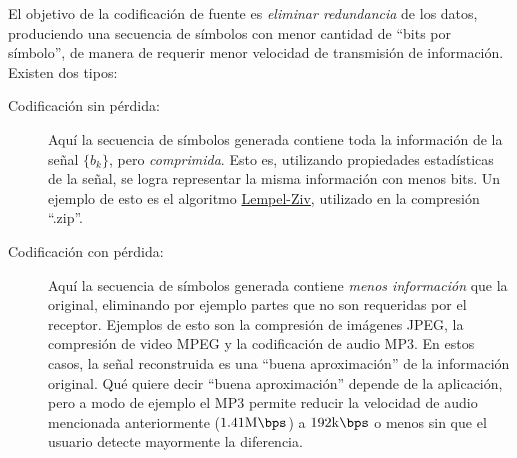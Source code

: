 El objetivo de la codificación de fuente es \emph{eliminar redundancia} de los datos, produciendo una secuencia de símbolos con menor cantidad de ``bits por símbolo'', de manera de requerir menor velocidad de transmisión de información. Existen dos tipos:
\begin{description}
    \item[Codificación sin pérdida:] Aquí la secuencia de símbolos generada contiene toda la información de la señal $\{b_k\}$, pero \emph{comprimida}. Esto es, utilizando propiedades estadísticas de la señal, se logra representar la misma información con menos bits. Un ejemplo de esto es el algoritmo \href{https://en.wikipedia.org/wiki/LZ77_and_LZ78}{Lempel-Ziv}, utilizado en la compresión ``.zip''.
    
    \item[Codificación con pérdida:] Aquí la secuencia de símbolos generada contiene \emph{menos información} que la original, eliminando por ejemplo partes que no son requeridas por el receptor. Ejemplos de esto son la compresión de imágenes JPEG, la compresión de video MPEG y la codificación de audio MP3. En estos casos, la señal reconstruida es una ``buena aproximación'' de la información original. Qué quiere decir ``buena aproximación'' depende de la aplicación, pero a modo de ejemplo el MP3 permite reducir la velocidad de audio mencionada anteriormente ($1.41 \unit{\mega\bps}$) a $192 \unit{\kilo\bps}$ o menos sin que el usuario detecte mayormente la diferencia. 
\end{description}

